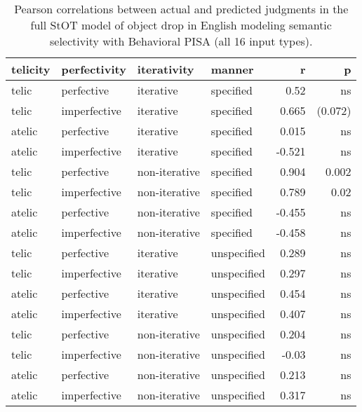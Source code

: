 \begin{table}[htb] %
\caption{Pearson correlations between actual and predicted judgments in the full StOT model of object drop in English modeling semantic selectivity with Behavioral PISA (all 16 input types).}
\begin{tabular}{llll|rr}
\textbf{telicity} & \textbf{perfectivity} & \textbf{iterativity} & \textbf{manner} & \textbf{r} & \textbf{p} \\
\hline
telic & perfective & iterative & specified              & 0.52 & ns \\
telic & imperfective & iterative & specified                  & 0.665 & (0.072) \\
atelic & perfective & iterative & specified             & 0.015 & ns \\
atelic & imperfective & iterative & specified                 & -0.521 & ns \\
telic & perfective & non-iterative & specified          & 0.904 & 0.002 \\
telic & imperfective & non-iterative & specified              & 0.789 & 0.02 \\
atelic & perfective & non-iterative & specified         & -0.455 & ns \\
atelic & imperfective & non-iterative & specified             & -0.458 & ns \\
telic & perfective & iterative & unspecified            & 0.289 & ns \\
telic & imperfective & iterative & unspecified                & 0.297 & ns \\
atelic & perfective & iterative & unspecified           & 0.454 & ns \\
atelic & imperfective & iterative & unspecified               & 0.407 & ns \\
telic & perfective & non-iterative & unspecified        & 0.204 & ns \\
telic & imperfective & non-iterative & unspecified            & -0.03 & ns \\
atelic & perfective & non-iterative & unspecified             & 0.213 & ns \\
atelic & imperfective & non-iterative & unspecified       & 0.317 & ns \\
\end{tabular}
\end{table}

